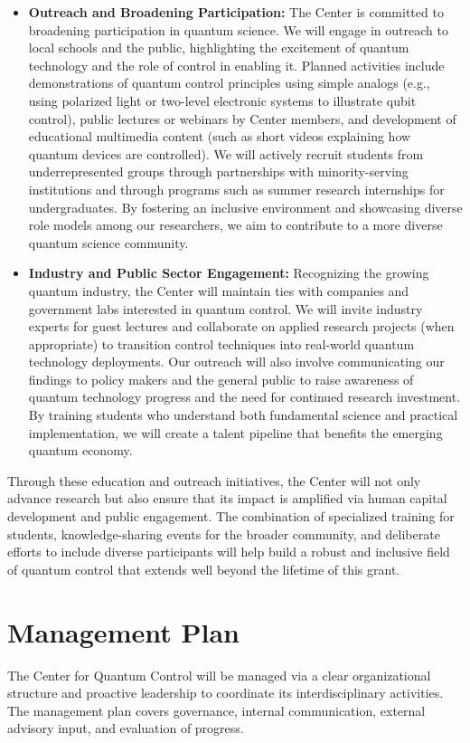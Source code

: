 \documentclass[11pt]{article}
\begin{document}
\begin{itemize}
   \item \textbf{Outreach and Broadening Participation:} The Center is committed to broadening participation in quantum science. We will engage in outreach to local schools and the public, highlighting the excitement of quantum technology and the role of control in enabling it. Planned activities include demonstrations of quantum control principles using simple analogs (e.g., using polarized light or two-level electronic systems to illustrate qubit control), public lectures or webinars by Center members, and development of educational multimedia content (such as short videos explaining how quantum devices are controlled). We will actively recruit students from underrepresented groups through partnerships with minority-serving institutions and through programs such as summer research internships for undergraduates. By fostering an inclusive environment and showcasing diverse role models among our researchers, we aim to contribute to a more diverse quantum science community.
   \item \textbf{Industry and Public Sector Engagement:} Recognizing the growing quantum industry, the Center will maintain ties with companies and government labs interested in quantum control. We will invite industry experts for guest lectures and collaborate on applied research projects (when appropriate) to transition control techniques into real-world quantum technology deployments. Our outreach will also involve communicating our findings to policy makers and the general public to raise awareness of quantum technology progress and the need for continued research investment. By training students who understand both fundamental science and practical implementation, we will create a talent pipeline that benefits the emerging quantum economy.
\end{itemize}

Through these education and outreach initiatives, the Center will not only advance research but also ensure that its impact is amplified via human capital development and public engagement. The combination of specialized training for students, knowledge-sharing events for the broader community, and deliberate efforts to include diverse participants will help build a robust and inclusive field of quantum control that extends well beyond the lifetime of this grant.

\section{Management Plan}
The Center for Quantum Control will be managed via a clear organizational structure and proactive leadership to coordinate its interdisciplinary activities. The management plan covers governance, internal communication, external advisory input, and evaluation of progress.
\end{document}
